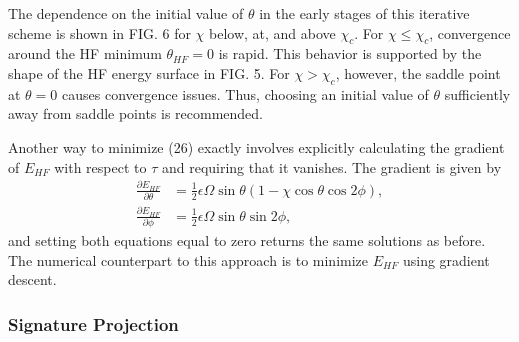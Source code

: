 \documentclass[prb,aps,twocolumn,showpacs,10pt]{revtex4-2}
\begin{document}
The dependence on the initial value of $\theta$ in the early stages of this iterative scheme is shown in FIG. 6 for $\chi$ below, at, and above $\chi_c$. For $\chi \leq \chi_c$, convergence around the HF minimum $\theta_{HF} = 0$ is rapid. This behavior is supported by the shape of the HF energy surface in FIG. 5. For $\chi > \chi_c$, however, the saddle point at $\theta=0$ causes convergence issues. Thus, choosing an initial value of $\theta$ sufficiently away from saddle points is recommended. 

Another way to minimize (26) exactly involves explicitly calculating the gradient of $E_{HF}$ with respect to $\tau$ and requiring that it vanishes. The gradient is given by
\begin{align}
\frac{\partial E_{HF}}{\partial \theta } &= \frac{1}{2} \epsilon \Omega \sin \theta (1-\chi \cos\theta \cos 2\phi),\\
\frac{\partial E_{HF}}{\partial \phi } &= \frac{1}{2} \epsilon \Omega \sin \theta \sin 2\phi,
\end{align}
and setting both equations equal to zero returns the same solutions as before. The numerical counterpart to this approach is to minimize $E_{HF}$ using gradient descent. 


\subsubsection{Signature Projection}
\end{document}

